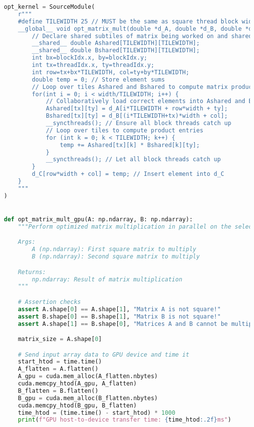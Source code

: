 \documentclass[11pt,twoside]{article}
\begin{document}
\begin{enumerate}
\begin{lstlisting}[language=Python]
opt_kernel = SourceModule(
    r"""
    #define TILEWIDTH 25 // MUST be the same as square thread block width/height!
    __global__ void opt_matrix_mult(double *d_A, double *d_B, double *d_C, int width) {
        // Declare shared subtiles of matrix being worked on and shared by all threads in the block in shared memory
        __shared__ double Ashared[TILEWIDTH][TILEWIDTH];
        __shared__ double Bshared[TILEWIDTH][TILEWIDTH];
        int bx=blockIdx.x, by=blockIdx.y;
        int tx=threadIdx.x, ty=threadIdx.y;
        int row=tx+bx*TILEWIDTH, col=ty+by*TILEWIDTH;
        double temp = 0; // Store element sums
        // Loop over tiles Ashared and Bshared to compute matrix product elements in d_C
        for(int i = 0; i < width/TILEWIDTH; i++) {
            // Collaboratively load correct elements into Ashared and Bshared to compute d_C
            Ashared[tx][ty] = d_A[i*TILEWIDTH + row*width + ty];
            Bshared[tx][ty] = d_B[(i*TILEWIDTH+tx)*width + col];
            __syncthreads(); // Ensure all block threads catch up
            // Loop over tiles to compute product entries
            for (int k = 0; k < TILEWIDTH; k++) {
                temp += Ashared[tx][k] * Bshared[k][ty];
            }
            __syncthreads(); // Let all block threads catch up
        }
        d_C[row*width + col] = temp; // Insert element into d_C
    }
    """
)


def opt_matrix_mult_gpu(A: np.ndarray, B: np.ndarray):
    """Perform optimized matrix multiplication in parallel on the selected GPU device

    Args:
        A (np.ndarray): First square matrix to multiply
        B (np.ndarray): Second square matrix to multiply

    Returns:
        np.ndarray: Result of matrix multiplication
    """

    # Assertion checks
    assert A.shape[0] == A.shape[1], "Matrix A is not square!"
    assert B.shape[0] == B.shape[1], "Matrix B is not square!"
    assert A.shape[1] == B.shape[0], "Matrices A and B cannot be multiplied!"

    matrix_size = A.shape[0]

    # Send input array data to GPU device and time it
    start_htod = time.time()
    A_flatten = A.flatten()
    A_gpu = cuda.mem_alloc(A_flatten.nbytes)
    cuda.memcpy_htod(A_gpu, A_flatten)
    B_flatten = B.flatten()
    B_gpu = cuda.mem_alloc(B_flatten.nbytes)
    cuda.memcpy_htod(B_gpu, B_flatten)
    time_htod = (time.time() - start_htod) * 1000
    print(f"GPU host-to-device transfer time: {time_htod:.2f}ms")


\end{lstlisting}
\end{enumerate}
\end{document}
